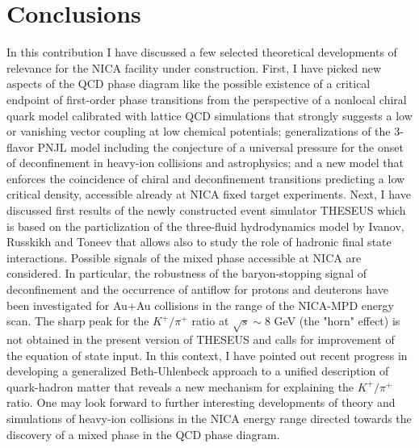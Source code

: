 \documentclass{webofc}
\begin{document}
\section{Conclusions}
In this contribution I have discussed a few selected theoretical developments of relevance for 
the NICA facility under construction.
First, I have picked new aspects of the QCD phase diagram like the possible existence of a critical endpoint of first-order phase transitions from the perspective of a nonlocal chiral quark model calibrated with lattice QCD simulations that strongly suggests a low or vanishing vector coupling at low chemical potentials; generalizations of the 3-flavor PNJL model including the conjecture of a universal pressure for the onset of deconfinement  in heavy-ion collisions and astrophysics; and a new model that enforces the coincidence of chiral and deconfinement transitions predicting a low critical density, accessible already at NICA fixed target experiments.
Next, I have discussed first results of the newly constructed event simulator THESEUS which is based on the particlization of the three-fluid hydrodynamics model by Ivanov, Russkikh and Toneev that allows also to study the role of hadronic final state interactions. Possible signals of the mixed phase accessible at NICA are considered. 
In particular, the robustness of the baryon-stopping signal of deconfinement and the occurrence of antiflow for protons and deuterons have been investigated for Au+Au collisions in the range of the NICA-MPD energy scan.
The sharp peak for the $K^+/\pi^+$ ratio at $\sqrt{s} \sim 8$ GeV (the "horn" effect) is not obtained in the present version of THESEUS and calls for improvement of the equation of state input.   
In this context, I have pointed out recent progress in developing a generalized Beth-Uhlenbeck approach to a unified description of quark-hadron matter that reveals a new mechanism for explaining the $K^+/\pi^+$ ratio. 
One may look forward to further interesting developments of theory and simulations of heavy-ion collisions in the NICA energy range directed towards the discovery of a mixed phase in the QCD phase diagram.
\end{document}
